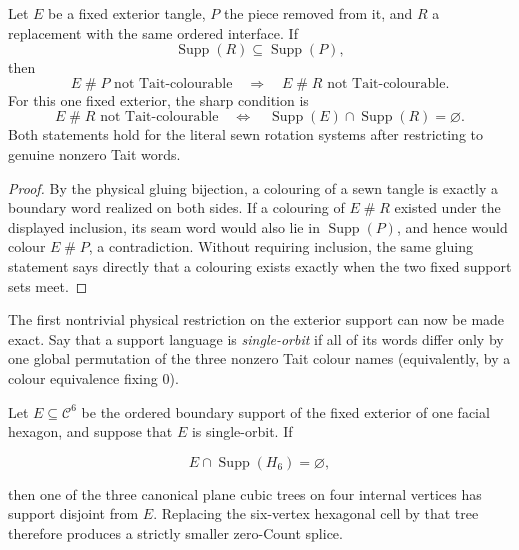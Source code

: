 \begin{theorem}
\label{thm:target-aware-support-replacement}
Let \(E\) be a fixed exterior tangle, \(P\) the piece removed from it, and
\(R\) a replacement with the same ordered interface.  If
\[
                  \operatorname{Supp}(R)\subseteq
                  \operatorname{Supp}(P),
\]
then
\[
       E\mathbin{\#}P\text{ not Tait-colourable}
       \quad\Longrightarrow\quad
       E\mathbin{\#}R\text{ not Tait-colourable}.
\]
For this one fixed exterior, the sharp condition is
\[
 E\mathbin{\#}R\text{ not Tait-colourable}
 \quad\Longleftrightarrow\quad
 \operatorname{Supp}(E)\cap\operatorname{Supp}(R)=\varnothing.
\]
Both statements hold for the literal sewn rotation systems after restricting
to genuine nonzero Tait words.
\end{theorem}

\begin{proof}
By the physical gluing bijection, a colouring of a sewn tangle is exactly a
boundary word realized on both sides.  If a colouring of
\(E\mathbin{\#}R\) existed under the displayed inclusion, its seam word
would also lie in \(\operatorname{Supp}(P)\), and hence would colour
\(E\mathbin{\#}P\), a contradiction.  Without requiring inclusion, the
same gluing statement says directly that a colouring exists exactly when the
two fixed support sets meet.
\end{proof}

The first nontrivial physical restriction on the exterior support can now be
made exact.  Say that a support language is \emph{single-orbit} if all of its
words differ only by one global permutation of the three nonzero Tait colour
names (equivalently, by a colour equivalence fixing \(0\)).

\begin{theorem}
\label{thm:hexagon-single-orbit-replacement}
Let \(E\subseteq\mathcal C^6\) be the ordered boundary support of the fixed
exterior of one facial hexagon, and suppose that \(E\) is single-orbit.  If

\[
                     E\cap\operatorname{Supp}(H_6)=\varnothing,
\]

then one of the three canonical plane cubic trees on four internal vertices
has support disjoint from \(E\).  Replacing the six-vertex hexagonal cell by
that tree therefore produces a strictly smaller zero-Count splice.
\end{theorem}

